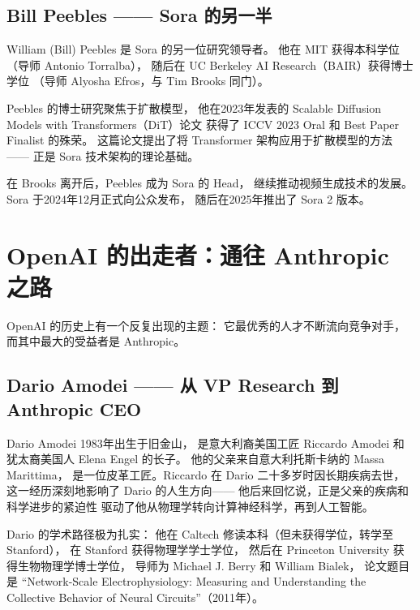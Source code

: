 \subsection{Bill Peebles —— Sora 的另一半}
\label{subsec:bill-peebles}

William (Bill) Peebles 是 Sora 的另一位研究领导者。
他在 MIT 获得本科学位（导师 Antonio Torralba），
随后在 UC Berkeley AI Research（BAIR）获得博士学位
（导师 Alyosha Efros，与 Tim Brooks 同门）。

Peebles 的博士研究聚焦于扩散模型，
他在2023年发表的 Scalable Diffusion Models with Transformers（DiT）论文
获得了 ICCV 2023 Oral 和 Best Paper Finalist 的殊荣。
这篇论文提出了将 Transformer 架构应用于扩散模型的方法——
正是 Sora 技术架构的理论基础。

在 Brooks 离开后，Peebles 成为 Sora 的 Head，
继续推动视频生成技术的发展。
Sora 于2024年12月正式向公众发布，
随后在2025年推出了 Sora 2 版本。


\section{OpenAI 的出走者：通往 Anthropic 之路}
\label{sec:openai-exodus-anthropic}

OpenAI 的历史上有一个反复出现的主题：
它最优秀的人才不断流向竞争对手，
而其中最大的受益者是 Anthropic。

\subsection{Dario Amodei —— 从 VP Research 到 Anthropic CEO}
\label{subsec:dario-amodei}

Dario Amodei 1983年出生于旧金山，
是意大利裔美国工匠 Riccardo Amodei 和犹太裔美国人 Elena Engel 的长子。
他的父亲来自意大利托斯卡纳的 Massa Marittima，
是一位皮革工匠。Riccardo 在 Dario 二十多岁时因长期疾病去世，
这一经历深刻地影响了 Dario 的人生方向——
他后来回忆说，正是父亲的疾病和科学进步的紧迫性
驱动了他从物理学转向计算神经科学，再到人工智能。

Dario 的学术路径极为扎实：
他在 Caltech 修读本科（但未获得学位，转学至 Stanford），
在 Stanford 获得物理学学士学位，
然后在 Princeton University 获得生物物理学博士学位，
导师为 Michael J. Berry 和 William Bialek，
论文题目是 ``Network-Scale Electrophysiology: Measuring and Understanding
the Collective Behavior of Neural Circuits''（2011年）。

